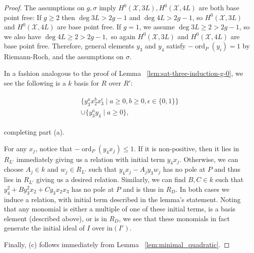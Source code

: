 \documentclass{amsart}
\theoremstyle{plain}
\theoremstyle{definition}
\theoremstyle{remark}
\numberwithin{equation}{section}
\newcommand \sx{\mathscr X}
\DeclareMathOperator{\ord}{ord}
\newcommand \halfcan{L}
\newcommand \initial{\text{in}}
\begin{document}
\begin{proof}
The assumptions on $g,\sigma$ imply $H^0(\sx, 3L), H^0(\sx, 4L)$ are both base point free: If $g \geq 2$ then $\deg 3L > 2g - 1$ and $\deg 4L > 2g - 1$, so $H^0(\sx, 3L)$ and $H^0(\sx, 4L)$ are base point free. If $g = 1$, we assume $\deg 3L \geq 2 > 2g - 1$, so we also have $\deg 4L \geq 2 > 2g - 1,$ so again $H^0(\sx, 3L)$ and $H^0(\sx, 4L)$ are base point free. Therefore, general elements $y_3$ and $y_4$ satisfy $-\ord
_P(y_i) = 1$ by Riemann-Roch, and the assumptions on $\sigma$.  

In a fashion analogous to the proof of Lemma 
~\ref{lem:sat-three-induction-g-0}, we see 
the following is a $k$ basis for $R$ over $R'$:

\begin{align}
\label{eqn:sat_two_add_generator}
	\begin{split}
		&\{ y_3^ax_2^b x_3^\epsilon \mid a \geq 0, b 
		\geq 0, \epsilon \in \{0, 1\}\} \\
		&\cup \{ y_3^ay_4 \mid a \geq 0 \},
	\end{split}
\end{align}

\noindent
completing part (a).

For any $x_j$, notice that $-\ord_P(y_4x_j)\le 1$. If it is non-positive, then it lies in $R_{\halfcan'}$ immediately giving us a relation with initial term $y_4x_j$. Otherwise, 
we can choose $A_j \in k$ and $w_j\in R_{\halfcan'}$ such that $y_4x_j -A_jy_3w_j$ has no pole at $P$ and thus lies in $R_{\halfcan'}$ giving us a desired relation. 
Similarly, we can find $B, C \in k$ such that $y_4^2 + B y_3^2 x_2+ Cy_3x_2x_3$ has no pole at $P$ and is thus in $R_D$. In both cases we induce a relation, with initial term described in the lemma's statement. Noting that any monomial is either a multiple of one of these initial terms, is a basis element (described above), or is in $R_D$, we see that these monomials in fact generate the initial ideal of $I$ over $\initial(I')$.

Finally, (c) follows immediately from Lemma ~\ref{lem:minimal_quadratic}.
\end{proof}
\end{document}
